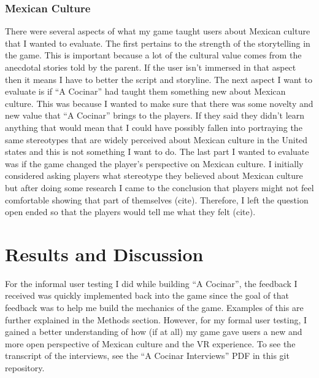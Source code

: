 \documentclass[10pt,twocolumn]{article}
\begin{document}
\subsubsection{Mexican Culture}
There were several aspects of what my game taught users about Mexican culture that I wanted to evaluate. The first pertains to the strength of the storytelling in the game. This is important because a lot of the cultural value comes from the anecdotal stories told by the parent. If the user isn’t immersed in that aspect then it means I have to better the script and storyline. The next aspect I want to evaluate is if “A Cocinar” had taught them something new about Mexican culture. This was because I wanted to make sure that there was some novelty and new value that “A Cocinar” brings to the players. If they said they didn’t learn anything that would mean that I could have possibly fallen into portraying the same stereotypes that are widely perceived about Mexican culture in the United states and this is not something I want to do. The last part I wanted to evaluate was if the game changed the player’s perspective on Mexican culture. I initially considered asking players what stereotype they believed about Mexican culture but after doing some research I came to the conclusion that players might not feel comfortable showing that part of themselves (cite). Therefore, I left the question open ended so that the players would tell me what they felt (cite).


\section{Results and Discussion}
For the informal user testing I did while building “A Cocinar”, the feedback I received was quickly implemented back into the game since the goal of that feedback was to help me build the mechanics of the game. Examples of this are further explained in the Methods section. However, for my formal user testing, I gained a better understanding of how (if at all) my game gave users a new and more open perspective of Mexican culture and the VR experience. To see the transcript of the interviews, see the “A Cocinar Interviews” PDF in this git repository.
\end{document}
